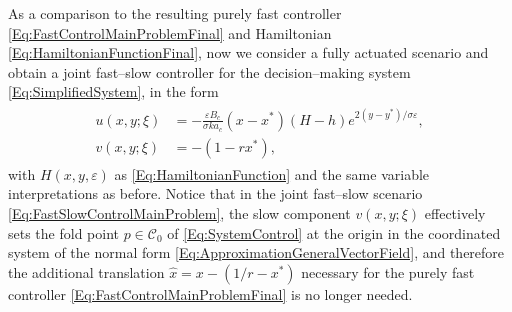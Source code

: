 \documentclass[3p]{elsarticle}
\theoremstyle{plain}
\theoremstyle{remark}
\theoremstyle{definition}
\begin{document}
    As a comparison to the resulting purely fast controller \eqref{Eq:FastControlMainProblemFinal} and Hamiltonian \eqref{Eq:HamiltonianFunctionFinal}, now we consider a fully actuated scenario and obtain a joint fast--slow controller for the decision--making system \eqref{Eq:SimplifiedSystem}, in the form
    \begin{align}
        \begin{split}
            u(x,y;\xi) &= -\frac{\varepsilon B_{c}}{\sigma k a_{c}}\left( x-x^{*} \right)\left( H-h \right)e^{2\left( y-y^{*} \right)/\sigma \varepsilon},\\
            v(x,y;\xi) &= -\left( 1-rx^{*} \right),
            \label{Eq:FastSlowControlMainProblem}
        \end{split}
    \end{align}
    with $H(x,y,\varepsilon)$ as \eqref{Eq:HamiltonianFunction} and the same variable interpretations as before. Notice that in the joint fast--slow scenario \eqref{Eq:FastSlowControlMainProblem}, the slow component $v(x,y;\xi)$ effectively sets the fold point $p\in\mathcal{C}_{0}$ of \eqref{Eq:SystemControl} at the origin in the coordinated system of the normal form \eqref{Eq:ApproximationGeneralVectorField}, and therefore the additional translation $\hat{x} = x-(1/r - x^{*})$ necessary for the purely fast controller \eqref{Eq:FastControlMainProblemFinal} is no longer needed. 
    
\end{document}
